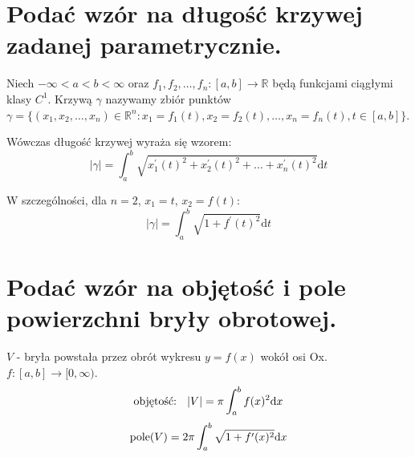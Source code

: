 \documentclass{article}
\theoremstyle{definition}
\theoremstyle{case}
\begin{document}
\section{Podać wzór na długość krzywej zadanej parametrycznie.}
Niech $-\infty < a < b < \infty$ oraz
$f_1, f_2, \dots, f_n \colon [a,b] \to \mathbb{R}$ będą funkcjami ciągłymi klasy $C^1$.
Krzywą $\gamma$ nazywamy zbiór punktów
${\gamma = \{ (x_1, x_2, \dots, x_n) \in \mathbb{R}^n \colon 
x_1 = f_1 (t), x_2 = f_2 (t), \dots, x_n = f_n (t), t \in [a,b] \} }$.

Wówczas długość krzywej wyraża się wzorem:
\begin{equation*}
	| \gamma | = \int_a^b \sqrt{x_1^\prime(t)^2 + x_2^\prime(t)^2 + \dots + x_n^\prime(t)^2} \mathrm d t
\end{equation*}

W szczególności, dla $n=2$, $x_1=t$, $x_2=f(t)$:
\begin{equation*}
	| \gamma | = \int_a^b \sqrt{1 + f ^\prime (t) ^2} \mathrm d t
\end{equation*}

\section{Podać wzór na objętość i pole powierzchni bryły obrotowej.}
\begin{wrapfigure}{R}{20em+2em}
	\def\svgwidth{20em}
	
\end{wrapfigure}
$V$ - bryła powstała przez obrót wykresu $y=f(x)$ wokół osi Ox. $f \colon [a,b] \to [0,\infty)$.
\begin{equation*}
	\textnormal{objętość: \enskip}
	| V | = \pi \int_a^b f(x)^2 \mathrm d x
\end{equation*}
\begin{equation*}
	\textnormal{pole} (V) = 2\pi \int_a^b \sqrt{1 + f^\prime(x)^2} \mathrm d x
\end{equation*}
\end{document}
